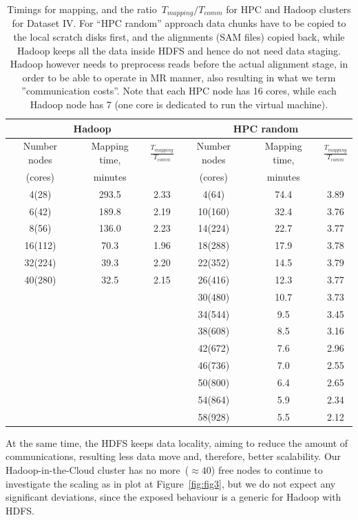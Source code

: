 \documentclass[11pt, oneside]{article}   	%
\begin{document}
\begin{table}[htdp]
\caption{Timings  for mapping, and the ratio~$T_{mapping}/T_{comm}$  for HPC and  Hadoop clusters for Dataset IV.
For ``HPC random'' approach data chunks have to be copied to the local scratch disks first, and the alignments (SAM files) copied back, while Hadoop keeps all the data inside HDFS and hence do not need data staging. Hadoop however needs to preprocess reads before the actual alignment stage, in order  to be able to operate in MR manner, also resulting in what we term ''communication costs''. Note that each HPC node has 16 cores, while each Hadoop node has 7 (one core is dedicated to run the virtual machine).}
\begin{center}
\begin{tabular}{|c|c|c|c|c|c|}
 \multicolumn{3}{|c|}{Hadoop} & \multicolumn{3}{c|}{ HPC random} \\
 \hline		


Number nodes	&Mapping time,	&$\frac{T_{mapping}}{T_{comm}}$	&Number  nodes	&Mapping time,	&$\frac{T_{mapping}}{T_{comm}}$\\
(cores)					&minutes		&							&(cores)			&minutes&\\
\hline
4(28)	&293.5	&2.33	&4(64)	&74.4	&3.89\\
6(42)	&189.8	&2.19	&10(160)	&32.4	&3.76\\
8(56)	&136.0	&2.23	&14(224)	&22.7	&3.77\\
16(112)	&70.3	&1.96	&18(288)	&17.9	&3.78\\
32(224)	&39.3	&2.20	&22(352)	&14.5	&3.79\\
40(280)	&32.5	&2.15	&26(416)	&12.3	&3.77\\
			&&&30(480)	&10.7	&3.73\\
			&&&34(544)	&9.5	&3.45\\
			&&&38(608)	&8.5	&3.16\\
			&&&42(672)	&7.6	&2.96\\
			&&&46(736)	&7.0	&2.55\\
			&&&50(800)	&6.4	&2.65\\
			&&&54(864)	&5.9	&2.34\\
			&&&58(928)	&5.5	&2.12\\

\end{tabular}
\end{center}
\label{table:4}
\end{table}%
 At the same time, the HDFS keeps data locality, aiming to reduce the amount of communications, resulting less data move and, therefore, better scalability.
Our Hadoop-in-the-Cloud cluster has no more~($\approx 40$) free nodes to continue to investigate the scaling as in plot at Figure~\ref{fig:fig3}, but we do not expect any significant deviations, since the exposed behaviour is a generic for Hadoop with HDFS.
\end{document}
